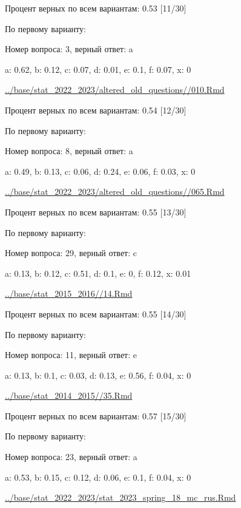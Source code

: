 

Процент верных по всем вариантам: 0.53 [11/30]

По первому варианту:

Номер вопроса: 3, верный ответ: a

a: 0.62, b: 0.12, c: 0.07, d: 0.01, e: 0.1, f: 0.07, x: 0

\url{../base/stat_2022_2023/altered_old_questions//010.Rmd}





Процент верных по всем вариантам: 0.54 [12/30]

По первому варианту:

Номер вопроса: 8, верный ответ: a

a: 0.49, b: 0.13, c: 0.06, d: 0.24, e: 0.06, f: 0.03, x: 0

\url{../base/stat_2022_2023/altered_old_questions//065.Rmd}





Процент верных по всем вариантам: 0.55 [13/30]

По первому варианту:

Номер вопроса: 29, верный ответ: c

a: 0.13, b: 0.12, c: 0.51, d: 0.1, e: 0, f: 0.12, x: 0.01

\url{../base/stat_2015_2016//14.Rmd}





Процент верных по всем вариантам: 0.55 [14/30]

По первому варианту:

Номер вопроса: 11, верный ответ: e

a: 0.13, b: 0.1, c: 0.03, d: 0.13, e: 0.56, f: 0.04, x: 0

\url{../base/stat_2014_2015//35.Rmd}





Процент верных по всем вариантам: 0.57 [15/30]

По первому варианту:

Номер вопроса: 23, верный ответ: a

a: 0.53, b: 0.15, c: 0.12, d: 0.06, e: 0.1, f: 0.04, x: 0

\url{../base/stat_2022_2023/stat_2023_spring_18_mc_rus.Rmd}





